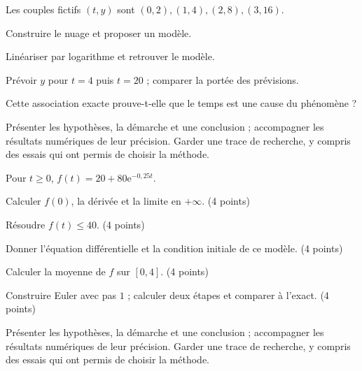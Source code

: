 \label{projet-9}
Les couples fictifs $(t,y)$ sont $(0,2),(1,4),(2,8),(3,16)$.
\begin{questions}
\item Construire le nuage et proposer un modèle.
\item Linéariser par logarithme et retrouver le modèle.
\item Prévoir $y$ pour $t=4$ puis $t=20$ ; comparer la portée des prévisions.
\item Cette association exacte prouve-t-elle que le temps est une cause du phénomène ?
\end{questions}
\vspace{5mm}\noindent Présenter les hypothèses, la démarche et une conclusion ; accompagner les résultats numériques de leur précision. Garder une trace de recherche, y compris des essais qui ont permis de choisir la méthode.\par\vfill{}\par\vspace{2mm}\noindent{}
\label{evaluation-1}
Pour $t\geq0$, $f(t)=20+80\mathrm e^{-0{,}25t}$.
\begin{questions}
\item Calculer $f(0)$, la dérivée et la limite en $+\infty$. \hfill(4 points)
\item Résoudre $f(t)\leq40$. \hfill(4 points)
\item Donner l’équation différentielle et la condition initiale de ce modèle. \hfill(4 points)
\item Calculer la moyenne de $f$ sur $[0,4]$. \hfill(4 points)
\item Construire Euler avec pas $1$ ; calculer deux étapes et comparer à l’exact. \hfill(4 points)
\end{questions}
\vspace{5mm}\noindent Présenter les hypothèses, la démarche et une conclusion ; accompagner les résultats numériques de leur précision. Garder une trace de recherche, y compris des essais qui ont permis de choisir la méthode.\par\vfill{}\par\vspace{2mm}\noindent{}
